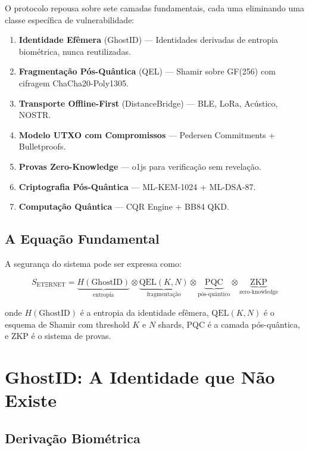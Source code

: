 \documentclass[12pt,a4paper,twoside]{book}
\theoremstyle{remark}
\newcommand{\ET}{\text{ETΞRNET}}
\begin{document}
O protocolo repousa sobre sete camadas fundamentais, cada uma eliminando uma classe específica de vulnerabilidade:

\begin{enumerate}
    \item \textbf{Identidade Efêmera} (GhostID) — Identidades derivadas de entropia biométrica, nunca reutilizadas.
    \item \textbf{Fragmentação Pós-Quântica} (QEL) — Shamir sobre GF(256) com cifragem ChaCha20-Poly1305.
    \item \textbf{Transporte Offline-First} (DistanceBridge) — BLE, LoRa, Acústico, NOSTR.
    \item \textbf{Modelo UTXO com Compromissos} — Pedersen Commitments + Bulletproofs.
    \item \textbf{Provas Zero-Knowledge} — o1js para verificação sem revelação.
    \item \textbf{Criptografia Pós-Quântica} — ML-KEM-1024 + ML-DSA-87.
    \item \textbf{Computação Quântica} — CQR Engine + BB84 QKD.
\end{enumerate}

\section{A Equação Fundamental}

A segurança do sistema pode ser expressa como:

\begin{equation}
S_{\ET} = \underbrace{H(\text{GhostID})}_{\text{entropia}} \otimes \underbrace{\text{QEL}(K,N)}_{\text{fragmentação}} \otimes \underbrace{\text{PQC}}_{\text{pós-quântico}} \otimes \underbrace{\text{ZKP}}_{\text{zero-knowledge}}
\end{equation}

onde $H(\text{GhostID})$ é a entropia da identidade efêmera, $\text{QEL}(K,N)$ é o esquema de Shamir com threshold $K$ e $N$ shards, PQC é a camada pós-quântica, e ZKP é o sistema de provas.

\chapter{GhostID: A Identidade que Não Existe}
\label{chap:ghostid}

\section{Derivação Biométrica}
\end{document}
